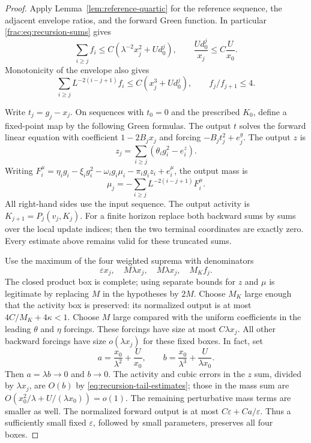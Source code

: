 \documentclass[11pt]{article}
\begin{document}
\begin{proof}
Apply Lemma~\ref{lem:reference-quartic} for the reference sequence,
the adjacent envelope ratios, and the forward Green function. In
particular \eqref{frac:eq:recursion-sums} gives
\begin{equation}\label{eq:recursion-tail-estimates}
 \sum_{i\ge j}f_i\le C(\lambda^{-2}x_j^2+Ud_0^j),
 \qquad \frac{Ud_0^j}{x_j}\le C\frac U{x_0}.
\end{equation}
Monotonicity of the envelope also gives
\begin{equation}\label{eq:recursion-geometric-estimate}
 \sum_{i\ge j}L^{-2(i-j+1)}f_i
 \le C(x_j^3+Ud_0^j),
 \qquad f_j/f_{j+1}\le4.
\end{equation}

Write \(t_j=g_j-x_j\).  On sequences with \(t_0=0\) and the
prescribed \(K_0\), define a fixed-point map by the following Green
formulas.  The output \(t\) solves the forward linear equation with
coefficient \(1-2B_jx_j\) and forcing
\(-B_jt_j^2+e_j^g\).  The output \(z\) is
\[
 z_j=\sum_{i\ge j}(\theta_i g_i^2-e_i^z).
\]
Writing
\(F_i^\mu=\eta_i g_i-\xi_i g_i^2-
\omega_i g_i\mu_i-\pi_i g_i z_i+e_i^\mu\), the output mass is
\[
 \mu_j=-\sum_{i\ge j}L^{-2(i-j+1)}F_i^\mu .
\]
All right-hand sides use the input sequence.  The output activity is
\(K_{j+1}=P_j(v_j,K_j)\).  For a finite horizon replace both
backward sums by sums over the local update indices; then the two
terminal coordinates are exactly zero.  Every estimate above remains
valid for these truncated sums.

Use the maximum of the four weighted suprema with denominators
\[
 \varepsilon x_j,\quad M\lambda x_j,\quad M\lambda x_j,
 \quad M_K f_j.
\]
The closed product box is complete; using separate bounds for \(z\)
and \(\mu\) is legitimate by replacing \(M\) in the hypotheses
by \(2M\).  Choose \(M_K\) large enough that the activity box is
preserved: its normalized output is at most
\(4C/M_K+4\kappa<1\).  Choose \(M\) large compared with the
uniform coefficients in the leading \(\theta\) and \(\eta\)
forcings.  These forcings have size at most \(C\lambda x_j\).
All other backward forcings have size \(o(\lambda x_j)\) for
these fixed boxes.  In fact, set
\[
 a=\frac{x_0}{\lambda^2}+\frac U{x_0},\qquad
 b=\frac{x_0}{\lambda^3}+\frac U{\lambda x_0}.
\]
Then \(a=\lambda b\to0\) and \(b\to0\).  The activity and
cubic errors in the \(z\) sum, divided by \(\lambda x_j\),
are \(O(b)\) by \eqref{eq:recursion-tail-estimates}; those in
the mass sum are \(O(x_0^2/\lambda+U/(\lambda x_0))=o(1)\).
The remaining perturbative mass terms are smaller as well.
The normalized forward output is at most
\(C\varepsilon+Ca/\varepsilon\).  Thus a sufficiently small
fixed \(\varepsilon\), followed by small parameters, preserves
all four boxes.


\end{proof}
\end{document}
